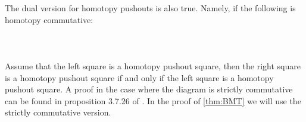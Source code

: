 The dual version for homotopy pushouts is also true. Namely, if the following is homotopy commutative: 
 \\~\\  \\~\\
Assume that the left square is a homotopy pushout square, then the right square is a homotopy pushout square if and only if the left square is a homotopy pushout square. A proof in the case where the diagram is strictly commutative can be found in proposition 3.7.26 of \cite{CHT}. In the proof of \ref{thm:BMT} we will use the strictly commutative version. 

